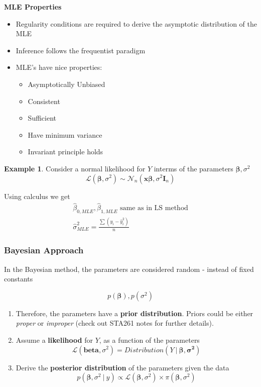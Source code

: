 \documentclass[11pt]{article}
\newcommand\VEC{\bm}{}
\theoremstyle{definition}
\newtheorem{example}{Example}[section]
\numberwithin{equation}{section}
\begin{document}
\textbf{MLE Properties}
\begin{itemize}
  \item Regularity conditions are required to derive the asymptotic distribution of the MLE
  \item Inference follows the frequentist paradigm
  \item MLE's have nice properties:
  \begin{itemize}
    \item Asymptotically Unbiased
    \item Consistent
    \item Sufficient
    \item Have minimum variance
    \item Invariant principle holds
  \end{itemize}
\end{itemize}

\begin{example}
  Consider a normal likelihood for $Y$ interms of the parameters $\VEC{\beta}, \sigma^2$
  \begin{equation*}
    \mathcal{L}(\VEC{\beta},\sigma^2)\sim\mathcal{N}_n(\VEC{x\beta}, \sigma^2\VEC{I}_n)
  \end{equation*}

  Using calculus we get
  \begin{gather*}
    \hat{\beta}_{0,MLE},\hat{\beta}_{1,MLE}\text{ same as in LS method}\\
    \hat{\sigma}^2_{MLE}=\frac{\sum(y_i - \hat{y}_i^2)}{n}
  \end{gather*}
\end{example}

\newpage

\subsubsection{Bayesian Approach}

In the Bayesian method, the parameters are considered random - instead of fixed constants

\begin{equation*}
  p(\VEC{\beta}), p(\sigma^2)
\end{equation*}
\begin{enumerate}
  \item Therefore, the parameters have a \textbf{prior distribution}. Priors could be either \textit{proper} or \textit{improper} (check out STA261 notes for further details).
  \item Assume a \textbf{likelihood} for $Y$, as a function of the parameters
  \begin{equation*}
    \mathcal{L}(\VEC{beta}, \sigma^2) = Distribution(Y\>|\>\VEC{\beta,\sigma^2})
  \end{equation*}
  \item Derive the \textbf{posterior distribution} of the parameters given the data
  \begin{equation}\label{posterior-distribution}
    p(\VEC{\beta},\sigma^2\>|\>y) \propto \mathcal{L}(\VEC{\beta},\sigma^2)\times\pi(\VEC{\beta},\sigma^2)
  \end{equation}
\end{enumerate}
\end{document}
